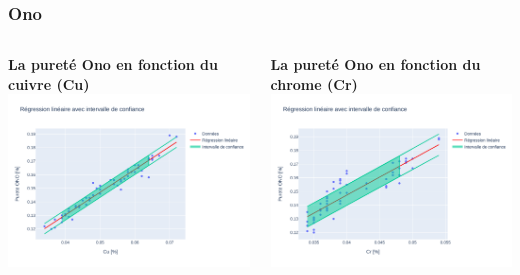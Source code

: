 \documentclass[aspectratio=169]{beamer}
\begin{document}
\begin{frame}
\frametitle{Ono}
\begin{columns}[t]
  \begin{column}{0.5\textwidth}
    \centering
    \textbf{La pureté Ono en fonction du cuivre (Cu)} \\
    \includegraphics[width=\textwidth]{Figures/Regression_Ono_Cu.pdf} 
  \end{column}
  \begin{column}{0.5\textwidth}
    \centering
    \textbf{La pureté Ono en fonction du chrome (Cr)} \\
    \includegraphics[width=\textwidth]{Figures/Regression_Ono_Cr.pdf} 
  \end{column}
\end{columns}
\end{frame}
\end{document}
